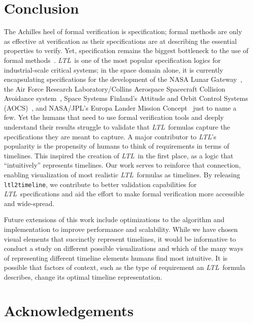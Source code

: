 \documentclass[conference]{IEEEtran}
\theoremstyle{definition}
\theoremstyle{remark}
\newcommand{\ltl}{\textit{LTL}}
\newcommand{\tool}{\hspace{0.1cm}\texttt{ltl2timeline}}
\begin{document}
\section{Conclusion}
The Achilles heel of formal verification is specification; formal methods are only as effective at verification as their specifications are at describing the essential properties to verify. Yet, specification remains the biggest bottleneck to the use of formal methods~\cite{Roz16}. \ltl\ is one of the most popular specification logics for industrial-scale critical systems; in the space domain alone, it is currently encapsulating specifications for the development of the NASA Lunar Gateway~\cite{DBR21}, the Air Force Research Laboratory/Collins Aerospace Spacecraft Collision Avoidance system~\cite{HDWF21}, Space Systems Finland's Attitude and Orbit Control Systems (AOCS)~\cite{ILLTV13}, and NASA/JPL's Europa Lander Mission Concept~\cite{CDRWRWL22} just to name a few.
Yet the humans that need to use formal verification tools and deeply understand their results struggle to validate that \ltl\ formulas capture the specifications they are meant to capture. A major contributor to \ltl's popularity is the propensity of humans to think of requirements in terms of timelines. This inspired the creation of \ltl\ in the first place, as a logic that ``intuitively'' represents timelines. Our work serves to reinforce that connection, enabling visualization of most realistic \ltl\ formulas as timelines. By releasing \tool, we contribute to better validation capabilities for \ltl\ specifications and aid the effort to make formal verification more accessible and wide-spread.

Future extensions of this work include optimizations to the algorithm and implementation to improve performance and scalability. While we have chosen visual elements that succinctly represent timelines, it would be informative to conduct a study on different possible visualizations and which of the many ways of representing different timeline elements humans find most intuitive. It is possible that factors of context, such as the type of requirement an \ltl\ formula describes, change its optimal timeline representation.

\section*{Acknowledgements}
\end{document}
